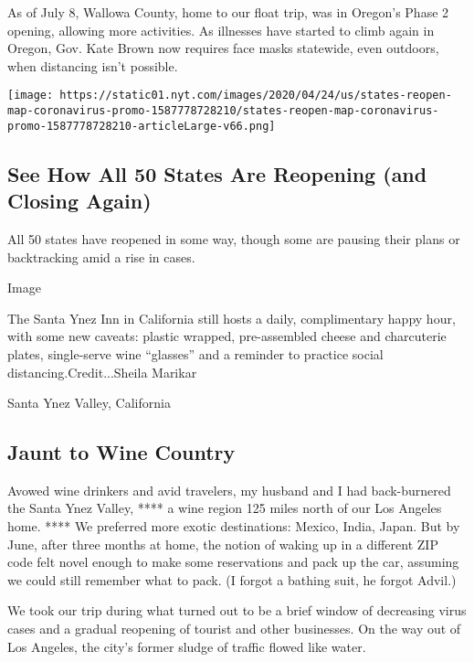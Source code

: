 As of July 8, Wallowa County, home to our float trip, was in Oregon's
Phase 2 opening, allowing more activities. As illnesses have started to
climb again in Oregon, Gov. Kate Brown now requires face masks
statewide, even outdoors, when distancing isn't possible.

\href{https://www.nytimes.com/interactive/2020/us/states-reopen-map-coronavirus.html}{}

\texttt{[image: https://static01.nyt.com/images/2020/04/24/us/states-reopen-map-coronavirus-promo-1587778728210/states-reopen-map-coronavirus-promo-1587778728210-articleLarge-v66.png]}

\hypertarget{see-how-all-50-states-are-reopening-and-closing-again}{%
\subsection{See How All 50 States Are Reopening (and Closing
Again)}\label{see-how-all-50-states-are-reopening-and-closing-again}}

All 50 states have reopened in some way, though some are pausing their
plans or backtracking amid a rise in cases.

Image

The Santa Ynez Inn in California still hosts a daily, complimentary
happy hour, with some new caveats: plastic wrapped, pre-assembled cheese
and charcuterie plates, single-serve wine ``glasses'' and a reminder to
practice social distancing.Credit...Sheila Marikar

Santa Ynez Valley, California

\hypertarget{jaunt-to-wine-country}{%
\subsection{Jaunt to Wine Country}\label{jaunt-to-wine-country}}

Avowed wine drinkers and avid travelers, my husband and I had
back-burnered the Santa Ynez Valley, **** a wine region 125 miles north
of our Los Angeles home. **** We preferred more exotic destinations:
Mexico, India, Japan. But by June, after three months at home, the
notion of waking up in a different ZIP code felt novel enough to make
some reservations and pack up the car, assuming we could still remember
what to pack. (I forgot a bathing suit, he forgot Advil.)

We took our trip during what turned out to be a brief window of
decreasing virus cases and a gradual reopening of tourist and other
businesses. On the way out of Los Angeles, the city's former sludge of
traffic flowed like water.

